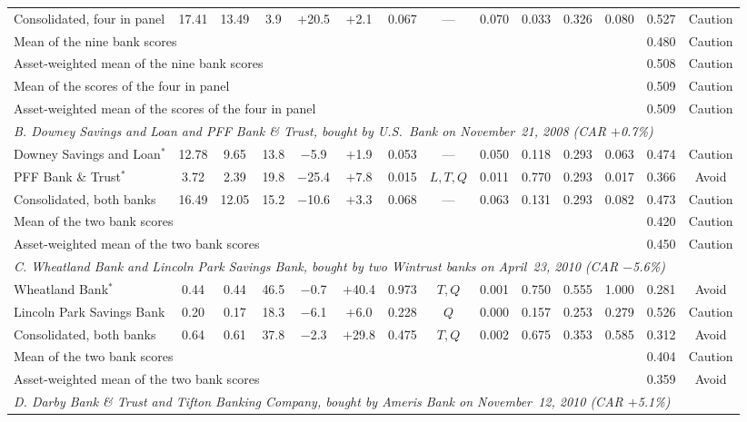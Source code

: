 \begin{table}[!t]
\begin{tabular*}{\textwidth}{@{\extracolsep{\fill}}lccccccccccccc}
Consolidated, four in panel & 17.41 & 13.49 & 3.9 & $+$20.5 & $+$2.1 & 0.067 & --- & 0.070 & 0.033 & 0.326 & 0.080 & 0.527 & Caution \\
\multicolumn{12}{l}{Mean of the nine bank scores} & 0.480 & Caution \\
\multicolumn{12}{l}{Asset-weighted mean of the nine bank scores} & 0.508 & Caution \\
\multicolumn{12}{l}{Mean of the scores of the four in panel} & 0.509 & Caution \\
\multicolumn{12}{l}{Asset-weighted mean of the scores of the four in panel} & 0.509 & Caution \\
\midrule
\multicolumn{14}{l}{\textit{B. Downey Savings and Loan and PFF Bank \& Trust, bought by U.S.~Bank on November~21, 2008 (CAR $+$0.7\%)}} \\
Downey Savings and Loan$^{*}$ & 12.78 & 9.65 & 13.8 & $-$5.9 & $+$1.9 & 0.053 & --- & 0.050 & 0.118 & 0.293 & 0.063 & 0.474 & Caution \\
PFF Bank \& Trust$^{*}$ & 3.72 & 2.39 & 19.8 & $-$25.4 & $+$7.8 & 0.015 & $L,T,Q$ & 0.011 & 0.770 & 0.293 & 0.017 & 0.366 & Avoid \\
Consolidated, both banks & 16.49 & 12.05 & 15.2 & $-$10.6 & $+$3.3 & 0.068 & --- & 0.063 & 0.131 & 0.293 & 0.082 & 0.473 & Caution \\
\multicolumn{12}{l}{Mean of the two bank scores} & 0.420 & Caution \\
\multicolumn{12}{l}{Asset-weighted mean of the two bank scores} & 0.450 & Caution \\
\midrule
\multicolumn{14}{l}{\textit{C. Wheatland Bank and Lincoln Park Savings Bank, bought by two Wintrust banks on April~23, 2010 (CAR $-$5.6\%)}} \\
Wheatland Bank$^{*}$ & 0.44 & 0.44 & 46.5 & $-$0.7 & $+$40.4 & 0.973 & $T,Q$ & 0.001 & 0.750 & 0.555 & 1.000 & 0.281 & Avoid \\
Lincoln Park Savings Bank & 0.20 & 0.17 & 18.3 & $-$6.1 & $+$6.0 & 0.228 & $Q$ & 0.000 & 0.157 & 0.253 & 0.279 & 0.526 & Caution \\
Consolidated, both banks & 0.64 & 0.61 & 37.8 & $-$2.3 & $+$29.8 & 0.475 & $T,Q$ & 0.002 & 0.675 & 0.353 & 0.585 & 0.312 & Avoid \\
\multicolumn{12}{l}{Mean of the two bank scores} & 0.404 & Caution \\
\multicolumn{12}{l}{Asset-weighted mean of the two bank scores} & 0.359 & Avoid \\
\midrule
\multicolumn{14}{l}{\textit{D. Darby Bank \& Trust and Tifton Banking Company, bought by Ameris Bank on November~12, 2010 (CAR $+$5.1\%)}} \\

\end{tabular*}
\end{table}
